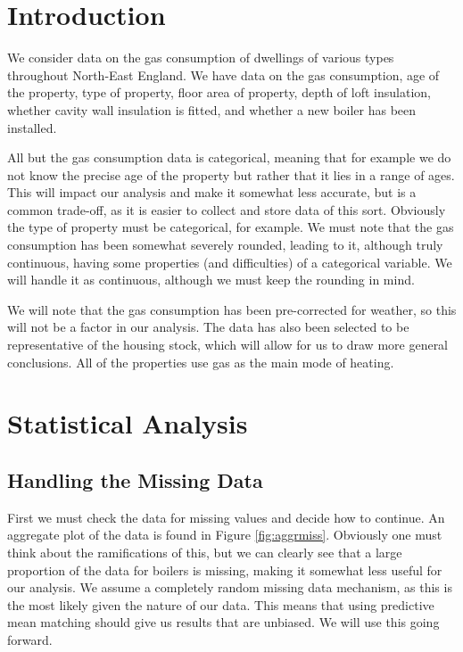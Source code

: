 \documentclass[11pt]{article}
\begin{document}
\section{Introduction}

We consider data on the gas consumption of dwellings of various types throughout North-East England. We have data on the gas consumption, age of the property, type of property, floor area of property, depth of loft insulation, whether cavity wall insulation is fitted, and whether a new boiler has been installed.

All but the gas consumption data is categorical, meaning that for example we do not know the precise age of the property but rather that it lies in a range of ages. This will impact our analysis and make it somewhat less accurate, but is a common trade-off, as it is easier to collect and store data of this sort. Obviously the type of property must be categorical, for example. We must note that the gas consumption has been somewhat severely rounded, leading to it, although truly continuous, having some properties (and difficulties) of a categorical variable. We will handle it as continuous, although we must keep the rounding in mind.

We will note that the gas consumption has been pre-corrected for weather, so this will not be a factor in our analysis. The data has also been selected to be representative of the housing stock, which will allow for us to draw more general conclusions. All of the properties use gas as the main mode of heating. 

\section{Statistical Analysis}

\subsection{Handling the Missing Data}

First we must check the data for missing values and decide how to continue. An aggregate plot of the data is found in Figure \ref{fig:aggrmiss}. Obviously one must think about the ramifications of this, but we can clearly see that a large proportion of the data for boilers is missing, making it somewhat less useful for our analysis. We assume a completely random missing data mechanism, as this is the most likely given the nature of our data. This means that using predictive mean matching should give us results that are unbiased. We will use this going forward.
\end{document}
